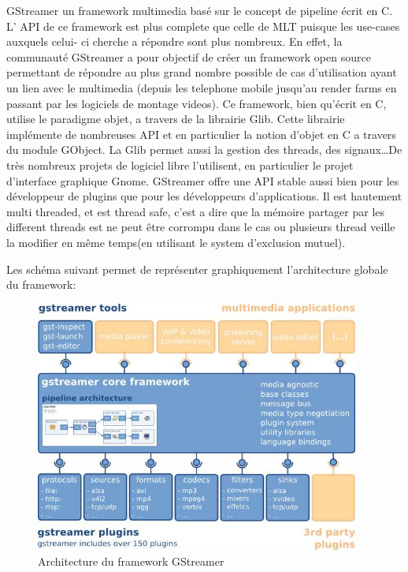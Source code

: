 GStreamer un framework multimedia basé sur le concept de pipeline
écrit en C.  L' API de ce framework est plus complete que celle de
MLT puisque les use-cases auxquels celui- ci cherche a répondre sont
plus nombreux. En effet, la communauté GStreamer a pour objectif de
créer un framework open source permettant de répondre au plus grand
nombre possible de cas d'utilisation ayant un lien avec le multimedia
(depuis les telephone mobile jusqu'au render farms en passant par les
logiciels de montage videos).  Ce framework, bien qu'écrit en C,
utilise le paradigme objet, a travers de la librairie Glib. Cette
librairie implémente de nombreuses API et en particulier la notion
d'objet en C a travers du module GObject. La Glib permet aussi la
gestion des threads, des signaux\ldots De très nombreux projets
de logiciel libre l'utilisent, en particulier le projet d'interface
graphique Gnome. GStreamer offre une API stable aussi bien pour les
développeur de plugins que pour les développeurs d'applications. Il
est hautement multi threaded, et est thread safe,
c'est a dire que la mémoire partager par les different threads est ne
peut être corrompu dans le cas ou plusieurs thread veille la modifier
en même temps(en utilisant le system d'exclusion mutuel).

Les schéma suivant permet de représenter graphiquement l'architecture
globale du framework:

\begin{figure} [H]

  \begin{center}

    \includegraphics[width=0.95\textwidth]{images/gstoverview}

  \end{center}

  \caption{Architecture du framework GStreamer}

  \label{Yes}

\end{figure}

